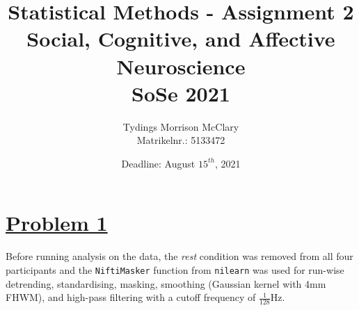 \documentclass[11pt, a4paper]{article}
\title{%
    \textbf{Statistical Methods - Assignment 2} \\
    \large Social, Cognitive, and Affective Neuroscience\\
    SoSe 2021}
\author{Tydings Morrison McClary \\
    Matrikelnr.: 5133472}
\date{Deadline: August $ 15^{th} $, 2021}
\begin{document}
\null  %
\nointerlineskip  %
\vfill
\let\snewpage \newpage
\let\newpage \relax
\maketitle
\let \newpage \snewpage
\vfill
\thispagestyle{empty}
\break %


\newpage
\section*{\centering \underline{Problem 1}}

Before running analysis on the data, the \emph{rest} condition was removed from all four participants and the \verb|NiftiMasker| function from \verb|nilearn| was used for run-wise detrending, standardising, masking, smoothing (Gaussian kernel with 4mm FHWM), and high-pass filtering with a cutoff frequency of $\frac{1}{128}$Hz.\\
\end{document}
